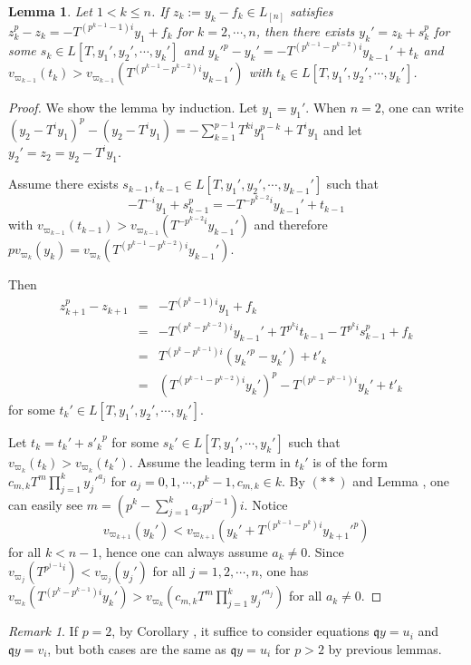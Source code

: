 \documentclass{proc-l}
\newtheorem{lemma}[theorem]{Lemma}
\theoremstyle{definition}
\theoremstyle{remark}
\newtheorem{remark}[theorem]{Remark}
\numberwithin{equation}{section}
\begin{document}
\begin{lemma}\label{4.9}
    Let $1<k\leq n$. If $z_k:=y_k-f_k\in L_{[n]}$ satisfies $z_k^p-z_k=-T^{(p^{k-1}-1)i}y_1+f_k$ for $k=2,\cdots,n$, then there exists $y_k'=z_k+s_k^p$ for some $s_k\in L[T,y_1',y_2',\cdots,y_{k}']$ and $y_k'^p-y_k'=-T^{(p^{k-1}-p^{k-2})i}y_{k-1}'+t_k$ and $v_{\varpi_{k-1}}(t_k)>v_{\varpi_{k-1}}(T^{(p^{k-1}-p^{k-2})i}y_{k-1}')$ with $t_k\in L[T,y_1',y_2',\cdots,y_{k}']$.
\end{lemma}
\begin{proof}
    We show the lemma by induction. Let $y_1=y_1'$. When $n=2$,  one can write $(y_2-T^iy_1)^p-(y_2-T^iy_1)=-\sum_{k=1}^{p-1}T^{ki}y_1^{p-k}+T^iy_1$ and let $y_2'=z_2=y_2-T^iy_1$.
    
    Assume there exists $s_{k-1},t_{k-1}\in L[T,y_1',y_2',\cdots,y_{k-1}']$ such that $$-T^{-i}y_1+s_{k-1}^p=-T^{-p^{k-2}i}y_{k-1}'+t_{k-1}$$ with $v_{\varpi_{k-1}}(t_{k-1})>v_{\varpi_{k-1}}(T^{-p^{k-2}i}y_{k-1}')$ and therefore $pv_{\varpi_{k}}(y_k)=v_{\varpi_k}(T^{(p^{k-1}-p^{k-2})i}y_{k-1}')$.
    
    Then
    \begin{eqnarray*}
        z_{k+1}^p-z_{k+1}&=&-T^{(p^{k}-1)i}y_1+f_k\\
        &=&-T^{(p^k-p^{k-2})i}y_{k-1}'+T^{p^ki}t_{k-1}-T^{p^ki}s_{k-1}^p+f_k\\
        &=&T^{(p^{k}-p^{k-1})i}(y_k'^p-y_k')+t'_{k}\\
        &=&(T^{(p^{k-1}-p^{k-2})i}y_k')^p-T^{(p^k-p^{k-1})i}y_k'+t'_{k}
    \end{eqnarray*}
    for some $t_{k}'\in L[T,y_1',y_2',\cdots,y_k']$. %

    Let $t_{k}=t_{k}'+{s'_{k}}^p$ for some $s_k'\in L[T,y_1',\cdots,y_k']$ such that $v_{\varpi_k}(t_k)>v_{\varpi_k}(t_k')$. Assume the leading term in $t_{k}'$ is of the form $c_{m,k}T^m\prod_{j=1}^{k}y_j'^{a_j}$ for $a_j=0,1,\cdots,p^{k}-1,c_{m,k}\in k$. By $(**)$ and Lemma \boxed{\ref{4.8}}, one can easily see $m=(p^{k}-\sum_{j=1}^{k}a_jp^{j-1})i$. Notice $$v_{\varpi_{k+1}}(y_k')<v_{\varpi_{k+1}}(y_k'+T^{(p^{k-1}-p^k)i}y_{k+1}'^p)$$ for all $k<n-1$, hence one can always assume $a_{k}\neq0$. Since $v_{\varpi_j}(T^{p^{j-1}i})<v_{\varpi_j}(y_j')$ for all $j=1,2,\cdots,n$, one has $v_{\varpi_k}(T^{(p^k-p^{k-1})i}y_k')>v_{\varpi_k}(c_{m,k}T^m\prod_{j=1}^{k}y_j'^{a_j})$ for all $a_{k}\neq0$.
\end{proof}
\begin{remark}
    If $p=2$, by Corollary \boxed{\ref{3.8}}, it suffice to consider equations $\mathfrak qy=u_i$ and $\mathfrak qy=v_i$, but both cases are the same as $\mathfrak qy=u_i$ for $p>2$ by previous lemmas.
\end{remark}
\end{document}
